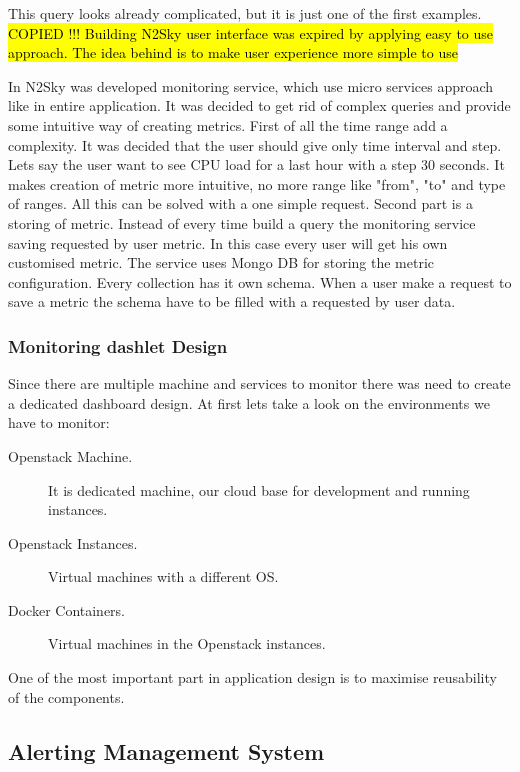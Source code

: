 This query looks already complicated, but it is just one of the first examples. 
\hl{COPIED !!! Building N2Sky user interface was expired by applying easy to use approach. The idea behind is to make user experience more simple to use  }

In N2Sky was developed monitoring service, which use micro services approach like in entire application. It was decided to get rid of complex queries and provide some intuitive way of creating metrics. 
First of all the time range add a complexity. It was decided that the user should give only time interval and step. Lets say the user want to see CPU load for a last hour with a step 30 seconds. It makes creation of metric more intuitive, no more range like "from", "to" and type of ranges. All this can be solved with a one simple request. 
Second part is a storing of metric. Instead of every time build a query the monitoring service saving requested by user metric. In this case every user will get his own customised metric. 
The service uses Mongo DB for storing the metric configuration. Every collection has it own schema. When a user make a request to save a metric the schema have to be filled with a requested by user data.

\subsubsection{Monitoring dashlet Design}\label{Monitoring dashlet Design}

Since there are multiple machine and services to monitor there was need to create a dedicated dashboard design.  At first lets take a look on the environments we have to monitor: 
\begin{description}
\item[Openstack Machine.]  It is dedicated machine, our cloud base for development and running instances.
\item[Openstack Instances.]   Virtual machines with a different OS.
\item[Docker Containers.]  Virtual machines in the Openstack instances.
\end{description}

One of the most important part in application design is to maximise reusability of the components. 


\subsection{Alerting Management System}\label{Alerting Management System}

